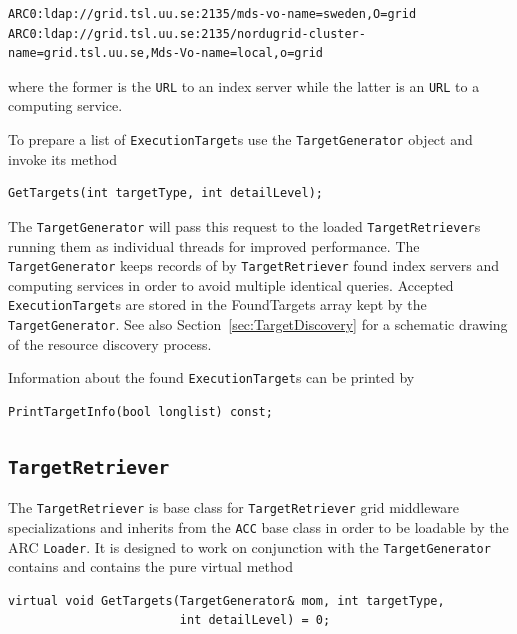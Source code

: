 \documentclass{book}
\newcommand{\TargetGenerator}{\texttt{TargetGenerator}}
\newcommand{\TargetRetriever}{\texttt{TargetRetriever}}
\newcommand{\ExecutionTarget}{\texttt{ExecutionTarget}}
\newcommand{\URL}{\texttt{URL}}
\begin{document}
\begin{shaded}
\begin{small}
\begin{verbatim}
ARC0:ldap://grid.tsl.uu.se:2135/mds-vo-name=sweden,O=grid
ARC0:ldap://grid.tsl.uu.se:2135/nordugrid-cluster-name=grid.tsl.uu.se,Mds-Vo-name=local,o=grid
\end{verbatim}
\end{small}
\end{shaded}

where the former is the {\URL} to an index server while the latter is an {\URL} to a computing service.

To prepare a list of {\ExecutionTarget}s use the {\TargetGenerator} object and invoke its method

\begin{shaded}
\begin{verbatim}
GetTargets(int targetType, int detailLevel);
\end{verbatim}
\end{shaded}

The {\TargetGenerator} will pass this request to the loaded {\TargetRetriever}s running them as individual threads 
for improved performance. The {\TargetGenerator} keeps records of by {\TargetRetriever} found index servers and computing 
services in order to avoid multiple identical queries. Accepted {\ExecutionTarget}s are stored in the FoundTargets 
array kept by the {\TargetGenerator}. See also Section~\ref{sec:TargetDiscovery} for a schematic drawing of the 
resource discovery process.

Information about the found {\ExecutionTarget}s can be printed by 

\begin{shaded}
\begin{verbatim}
PrintTargetInfo(bool longlist) const;
\end{verbatim}
\end{shaded}

\subsection{{\TargetRetriever}} The {\TargetRetriever} is base class for {\TargetRetriever} grid middleware specializations and 
inherits from the \texttt{ACC} base class in order to be loadable by the ARC \texttt{Loader}. It is designed to work on conjunction 
with the {\TargetGenerator} contains and contains the pure virtual method

\begin{shaded}
\begin{verbatim}
virtual void GetTargets(TargetGenerator& mom, int targetType,
                        int detailLevel) = 0;
\end{verbatim}
\end{shaded}
\end{document}
